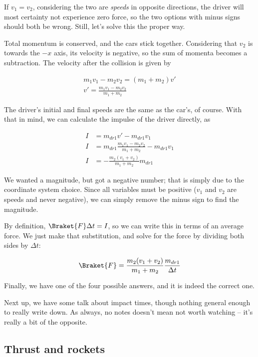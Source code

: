 If $v_1 = v_2$, considering the two are \emph{speeds} in opposite directions, the driver will most certainty not experience zero force, so the two options with minus signs should both be wrong. Still, let's solve this the proper way.

Total momentum is conserved, and the cars stick together. Considering that $v_2$ is towards the $-x$ axis, its velocity is negative, so the sum of momenta becomes a subtraction. The velocity after the collision is given by

\begin{align}
m_1 v_1 - m_2 v_2 = (m_1 + m_2) v'\\
v' = \frac{m_1 v_1 - m_2 v_2}{m_1 + m_2}
\end{align}

The driver's initial and final speeds are the same as the car's, of course. With that in mind, we can calculate the impulse of the driver directly, as

\begin{align}
I &= m_{dr1} v' - m_{dr1} v_1\\
I &= m_{dr1}  \frac{m_1 v_1 - m_2 v_2}{m_1 + m_2} - m_{dr1} v_1\\
I &= - \frac{m_2(v_1 + v_2)}{m_1 + m_2} m_{dr1}
\end{align}

We wanted a magnitude, but got a negative number; that is simply due to the coordinate system choice. Since all variables must be positive ($v_1$ and $v_2$ are speeds and never negative), we can simply remove the minus sign to find the magnitude.

By definition, $\Braket{F} \Delta t = I$, so we can write this in terms of an average force. We just make that substitution, and solve for the force by dividing both sides by $\Delta t$:

\begin{equation}
\Braket{F} = \frac{m_2(v_1 + v_2)}{m_1 + m_2} \frac{m_{dr1}}{\Delta t}
\end{equation}

Finally, we have one of the four possible answers, and it is indeed the correct one.

Next up, we have some talk about impact times, though nothing general enough to really write down. As always, no notes doesn't mean not worth watching -- it's really a bit of the opposite.

\subsection{Thrust and rockets}


